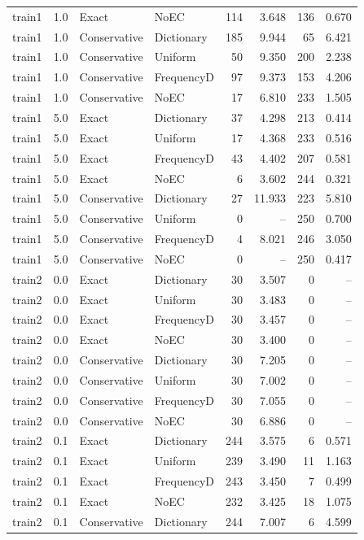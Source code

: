 \begin{longtable}{@{}lrllrrrr@{}}
train1 & 1.0 & Exact & NoEC & 114 & 3.648 & 136 & 0.670\\
train1 & 1.0 & Conservative & Dictionary & 185 & 9.944 & 65 & 6.421\\
train1 & 1.0 & Conservative & Uniform & 50 & 9.350 & 200 & 2.238\\
train1 & 1.0 & Conservative & FrequencyD & 97 & 9.373 & 153 & 4.206\\
train1 & 1.0 & Conservative & NoEC & 17 & 6.810 & 233 & 1.505\\
train1 & 5.0 & Exact & Dictionary & 37 & 4.298 & 213 & 0.414\\
train1 & 5.0 & Exact & Uniform & 17 & 4.368 & 233 & 0.516\\
train1 & 5.0 & Exact & FrequencyD & 43 & 4.402 & 207 & 0.581\\
train1 & 5.0 & Exact & NoEC & 6 & 3.602 & 244 & 0.321\\
train1 & 5.0 & Conservative & Dictionary & 27 & 11.933 & 223 & 5.810\\
train1 & 5.0 & Conservative & Uniform & 0 & -- & 250 & 0.700\\
train1 & 5.0 & Conservative & FrequencyD & 4 & 8.021 & 246 & 3.050\\
train1 & 5.0 & Conservative & NoEC & 0 & -- & 250 & 0.417\\
train2 & 0.0 & Exact & Dictionary & 30 & 3.507 & 0 & --\\
train2 & 0.0 & Exact & Uniform & 30 & 3.483 & 0 & --\\
train2 & 0.0 & Exact & FrequencyD & 30 & 3.457 & 0 & --\\
train2 & 0.0 & Exact & NoEC & 30 & 3.400 & 0 & --\\
train2 & 0.0 & Conservative & Dictionary & 30 & 7.205 & 0 & --\\
train2 & 0.0 & Conservative & Uniform & 30 & 7.002 & 0 & --\\
train2 & 0.0 & Conservative & FrequencyD & 30 & 7.055 & 0 & --\\
train2 & 0.0 & Conservative & NoEC & 30 & 6.886 & 0 & --\\
train2 & 0.1 & Exact & Dictionary & 244 & 3.575 & 6 & 0.571\\
train2 & 0.1 & Exact & Uniform & 239 & 3.490 & 11 & 1.163\\
train2 & 0.1 & Exact & FrequencyD & 243 & 3.450 & 7 & 0.499\\
train2 & 0.1 & Exact & NoEC & 232 & 3.425 & 18 & 1.075\\
train2 & 0.1 & Conservative & Dictionary & 244 & 7.007 & 6 & 4.599\\

\end{longtable}
